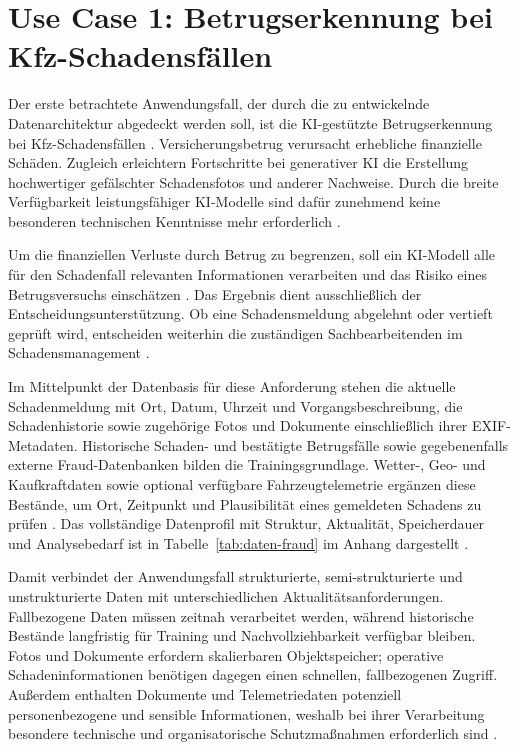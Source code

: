 \section{Use Case 1: Betrugserkennung bei Kfz-Schadensfällen}
\label{sec:fraud}

Der erste betrachtete Anwendungsfall, der durch die zu entwickelnde
Datenarchitektur abgedeckt werden soll, ist die KI-gestützte
Betrugserkennung bei Kfz-Schadensfällen
\citep[Folie~11]{nordakademieSzenarioVersicherung}. Versicherungsbetrug
verursacht erhebliche finanzielle Schäden. Zugleich erleichtern Fortschritte bei
generativer KI die Erstellung hochwertiger gefälschter Schadensfotos und
anderer Nachweise. Durch die breite Verfügbarkeit leistungsfähiger KI-Modelle
sind dafür zunehmend keine besonderen technischen Kenntnisse mehr
erforderlich \citep{hever2025}.

Um die finanziellen Verluste durch Betrug zu begrenzen, soll ein KI-Modell alle
für den Schadenfall relevanten Informationen verarbeiten und das Risiko eines
Betrugsversuchs einschätzen
\citep{debener2023,nordakademieSzenarioVersicherung}. Das Ergebnis dient
ausschließlich der
Entscheidungsunterstützung. Ob eine Schadensmeldung abgelehnt oder vertieft
geprüft wird, entscheiden weiterhin die zuständigen Sachbearbeitenden im
Schadensmanagement
\citep[Folie~11]{nordakademieSzenarioVersicherung}.

Im Mittelpunkt der Datenbasis für diese Anforderung 
stehen die aktuelle Schadenmeldung mit Ort, Datum, Uhrzeit und
Vorgangsbeschreibung, die Schadenhistorie sowie zugehörige Fotos und Dokumente
einschließlich ihrer EXIF-Metadaten. Historische Schaden- und bestätigte
Betrugsfälle sowie gegebenenfalls externe Fraud-Datenbanken bilden die
Trainingsgrundlage. Wetter-, Geo- und Kaufkraftdaten sowie optional verfügbare
Fahrzeugtelemetrie ergänzen diese Bestände, um Ort, Zeitpunkt und Plausibilität
eines gemeldeten Schadens zu prüfen
\citep[Folie~11]{nordakademieSzenarioVersicherung}.
Das vollständige Datenprofil mit Struktur, Aktualität, Speicherdauer und
Analysebedarf ist in Tabelle~\ref{tab:daten-fraud} im Anhang dargestellt
\citep[Folien~11--12]{nordakademieSzenarioVersicherung}.

Damit verbindet der Anwendungsfall strukturierte, semi-strukturierte und
unstrukturierte Daten mit unterschiedlichen Aktualitätsanforderungen.
Fallbezogene Daten müssen zeitnah verarbeitet werden, während historische
Bestände langfristig für Training und Nachvollziehbarkeit verfügbar bleiben.
Fotos und Dokumente erfordern skalierbaren Objektspeicher; operative
Schadeninformationen benötigen dagegen einen schnellen, fallbezogenen Zugriff.
Außerdem enthalten Dokumente und Telemetriedaten potenziell personenbezogene
und sensible Informationen, weshalb bei ihrer Verarbeitung besondere
technische und organisatorische Schutzmaßnahmen erforderlich sind
\citep{euGDPR}.

